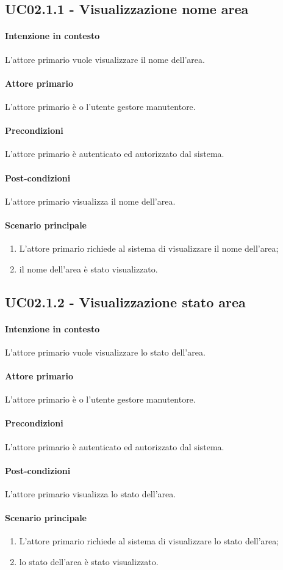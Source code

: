 \subsection{UC02.1.1 - Visualizzazione nome area}\label{uc:02.1.1}

\paragraph{Intenzione in contesto} L'attore primario vuole visualizzare il nome dell'area.
\paragraph{Attore primario} L'attore primario è o l'utente gestore manutentore.
\paragraph{Precondizioni}  L'attore primario è autenticato ed autorizzato dal sistema.
\paragraph{Post-condizioni} L'attore primario visualizza il nome dell'area.
\paragraph{Scenario principale}
\begin{enumerate}
    \item L'attore primario richiede al sistema di visualizzare il nome dell'area;
    \item il nome dell'area è stato visualizzato.
\end{enumerate}

\subsection{UC02.1.2 - Visualizzazione stato area}\label{uc:02.1.2}

\paragraph{Intenzione in contesto} L'attore primario vuole visualizzare lo stato dell'area.
\paragraph{Attore primario} L'attore primario è o l'utente gestore manutentore.
\paragraph{Precondizioni}  L'attore primario è autenticato ed autorizzato dal sistema.
\paragraph{Post-condizioni} L'attore primario visualizza lo stato dell'area.
\paragraph{Scenario principale}
\begin{enumerate}
    \item L'attore primario richiede al sistema di visualizzare lo stato dell'area;
    \item lo stato dell'area è stato visualizzato.
\end{enumerate}